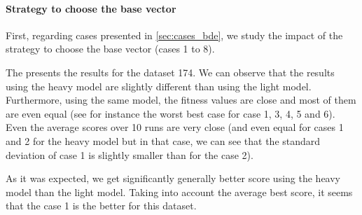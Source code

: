 \documentclass[12pt, openany]{article}
\begin{document}
\label{sec:BDE_parameters}

\paragraph{Strategy to choose the base vector} First, regarding cases presented in \ref{sec:cases_bde}, we study the impact of the strategy to choose the base vector (cases 1 to 8).

The  presents the results for the dataset 174. We can observe that the results using the heavy model are slightly different than using the light model. Furthermore, using the same model, the fitness values are close and most of them are even equal (see for instance the worst best case for case 1, 3, 4, 5 and 6). Even the average scores over 10 runs are very close (and even equal for cases 1 and 2 for the heavy model but in that case, we can see that the standard deviation of case 1 is slightly smaller than for the case 2).

As it was expected, we get significantly generally better score using the heavy model than the light model. Taking into account the average best score, it seems that the case 1 is the better for this dataset. 
\end{document}
